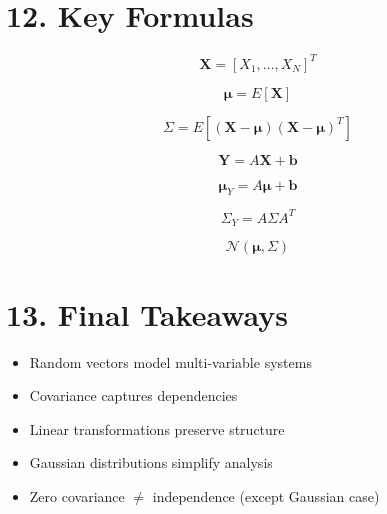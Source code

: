 \documentclass[12pt]{article}
\begin{document}
\section*{12. Key Formulas}

\[
\mathbf{X} = [X_1, ..., X_N]^T
\]

\[
\boldsymbol{\mu} = E[\mathbf{X}]
\]

\[
\Sigma = E[(\mathbf{X} - \boldsymbol{\mu})(\mathbf{X} - \boldsymbol{\mu})^T]
\]

\[
\mathbf{Y} = A\mathbf{X} + \mathbf{b}
\]

\[
\boldsymbol{\mu}_Y = A\boldsymbol{\mu} + \mathbf{b}
\]

\[
\Sigma_Y = A \Sigma A^T
\]

\[
\mathcal{N}(\boldsymbol{\mu}, \Sigma)
\]

\section*{13. Final Takeaways}

\begin{itemize}
\item Random vectors model multi-variable systems
\item Covariance captures dependencies
\item Linear transformations preserve structure
\item Gaussian distributions simplify analysis
\item Zero covariance $\neq$ independence (except Gaussian case)
\end{itemize}
\end{document}

